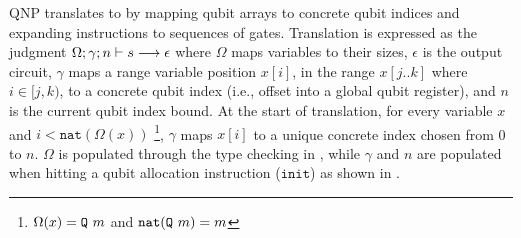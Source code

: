QNP translates \qafny to \sqir by mapping \qafny qubit arrays to \sqir concrete qubit indices and expanding \qafny instructions to sequences of \sqir gates.
%
%
Translation is expressed as the judgment
$\Omega;\gamma;n\vdash s \longrightarrow \epsilon$ where $\Omega$ maps \qafny variables to their sizes, 
$\epsilon$ is the output \sqir circuit, $\gamma$ maps a \qafny range variable
position $x[i]$, in the range $x[j..k]$ where $i \in [j,k)$, to a \sqir concrete qubit index (i.e., offset into a 
global qubit register), and $n$ is the current qubit index bound.  
At the start of translation, for every
variable $x$ and $i < \texttt{nat}(\Omega(x))$ \footnote{$\Omega(x)=\texttt{Q}~m$ and $\texttt{nat}(\texttt{Q}~m)=m$},
$\gamma$ maps $x[i]$ to a unique
concrete index chosen from 0 to $n$.
$\Omega$ is populated through the \qafny type checking in ,
while $\gamma$ and $n$ are populated when hitting a qubit allocation instruction ($\texttt{init}$) as shown in .

